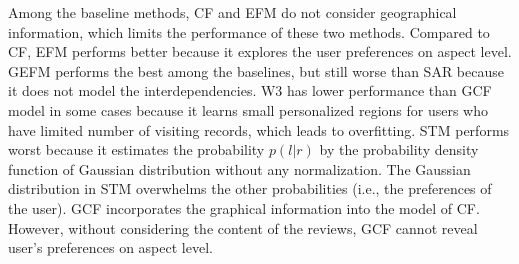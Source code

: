 Among the baseline methods, CF and EFM do not
consider geographical information, which limits
the performance of these two methods.
Compared to CF, EFM performs better because it
explores the user preferences on aspect level.
GEFM performs 
the best among the baselines, but still worse 
than SAR because it does not model the interdependencies.
W3 has lower performance than GCF model in some cases 
because it learns small personalized regions for 
users who have limited number of
visiting records, which leads to overfitting.
STM performs
worst because it estimates
the probability $p(l|r)$ by the probability density
function of Gaussian distribution without any
normalization. The Gaussian distribution in STM
overwhelms the other probabilities (i.e.,
the preferences of the user). GCF
incorporates the graphical information into the model of CF.
However, without considering
the content of the reviews,
GCF cannot reveal user's preferences
on aspect level.



